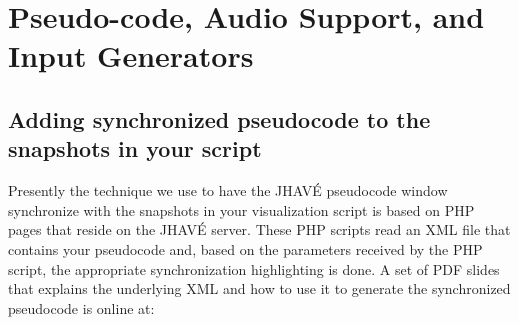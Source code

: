 \documentclass[11pt,letterpaper]{book}
\begin{document}
% 
% 
% 
% 





\chapter{Pseudo-code, Audio Support, and Input Generators}
\section{Adding synchronized pseudocode to the snapshots in your script}
\label{pseudocode-win}

Presently the technique we use to have the JHAV\'{E} pseudocode window
synchronize with the snapshots in your visualization script is based
on PHP pages that reside on the JHAV\'{E} server.  These PHP scripts
read an XML file that contains your pseudocode and, based on the
parameters received by the PHP script, the appropriate synchronization
highlighting is done.  A set of PDF slides that explains the
underlying XML and how to use it to generate the synchronized
pseudocode is online at:
\end{document}
